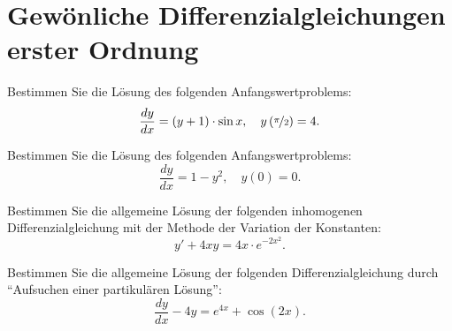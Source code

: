 \section{Gewönliche Differenzialgleichungen erster Ordnung}

\begin{ejercicio}
Bestimmen Sie die Lösung des folgenden Anfangswertproblems:
\[
\frac{dy}{dx} = (y + 1) \cdot \sin x, \quad y\left(\nicefrac{\pi}{2}\right) = 4.
\]
\end{ejercicio}

\begin{ejercicio}
Bestimmen Sie die Lösung des folgenden Anfangswertproblems:
\[
\frac{dy}{dx} = 1 - y^2, \quad y(0) = 0.
\]
\end{ejercicio}

\begin{ejercicio}
Bestimmen Sie die allgemeine Lösung der folgenden inhomogenen Differenzialgleichung
mit der Methode der Variation der Konstanten:
\[
y' + 4xy = 4x \cdot e^{-2x^2}.
\]
\end{ejercicio}

\begin{ejercicio}
Bestimmen Sie die allgemeine Lösung der folgenden Differenzialgleichung durch ``Aufsuchen einer partikulären Lösung'':
\[
\frac{dy}{dx} - 4y = e^{4x} + \cos(2x).
\]
\end{ejercicio}